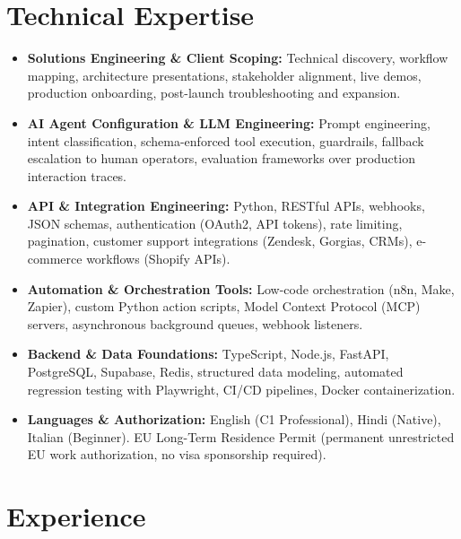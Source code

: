 \documentclass[10pt,a4paper]{article}
\begin{document}
\section{Technical Expertise}
\begin{itemize}
  \item \textbf{Solutions Engineering \& Client Scoping:} Technical discovery, workflow mapping, architecture presentations, stakeholder alignment, live demos, production onboarding, post-launch troubleshooting and expansion.
  \item \textbf{AI Agent Configuration \& LLM Engineering:} Prompt engineering, intent classification, schema-enforced tool execution, guardrails, fallback escalation to human operators, evaluation frameworks over production interaction traces.
  \item \textbf{API \& Integration Engineering:} Python, RESTful APIs, webhooks, JSON schemas, authentication (OAuth2, API tokens), rate limiting, pagination, customer support integrations (Zendesk, Gorgias, CRMs), e-commerce workflows (Shopify APIs).
  \item \textbf{Automation \& Orchestration Tools:} Low-code orchestration (n8n, Make, Zapier), custom Python action scripts, Model Context Protocol (MCP) servers, asynchronous background queues, webhook listeners.
  \item \textbf{Backend \& Data Foundations:} TypeScript, Node.js, FastAPI, PostgreSQL, Supabase, Redis, structured data modeling, automated regression testing with Playwright, CI/CD pipelines, Docker containerization.
  \item \textbf{Languages \& Authorization:} English (C1 Professional), Hindi (Native), Italian (Beginner). EU Long-Term Residence Permit (permanent unrestricted EU work authorization, no visa sponsorship required).
\end{itemize}

\section{Experience}
\end{document}

